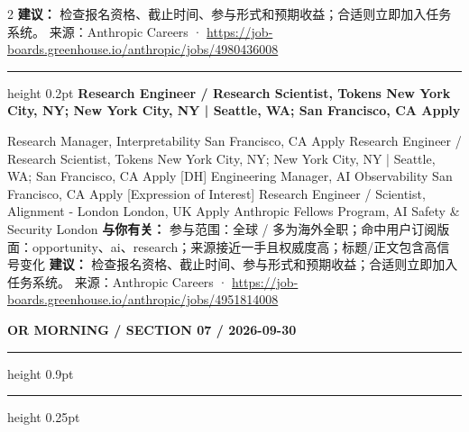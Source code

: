 \documentclass[10.5pt]{ctexart}
\begin{document}
\begin{multicols}{2}
\textbf{建议：} 检查报名资格、截止时间、参与形式和预期收益；合适则立即加入任务系统。
{\footnotesize\color{ormuted} 来源：Anthropic Careers · \url{https://job-boards.greenhouse.io/anthropic/jobs/4980436008}}
\vspace{2mm}
\hrule height 0.2pt
\vspace{2mm}
{\large\bfseries Research Engineer / Research Scientist, Tokens New York City, NY; New York City, NY | Seattle, WA; San Francisco, CA Apply}\par
[Expression of Interest] Research Manager, Interpretability San Francisco, CA Apply Research Engineer / Research Scientist, Tokens New York City, NY; New York City, NY | Seattle, WA; San Francisco, CA Apply [DH] Engineering Manager, AI Observability San Francisco, CA Apply [Expression of Interest] Research Engineer / Scientist, Alignment - London London, UK Apply Anthropic Fellows Program, AI Safety \& Security London
\textbf{与你有关：} 参与范围：全球 / 多为海外全职；命中用户订阅版面：opportunity、ai、research；来源接近一手且权威度高；标题/正文包含高信号变化
\textbf{建议：} 检查报名资格、截止时间、参与形式和预期收益；合适则立即加入任务系统。
{\footnotesize\color{ormuted} 来源：Anthropic Careers · \url{https://job-boards.greenhouse.io/anthropic/jobs/4951814008}}
\end{multicols}
\newpage
{\small\bfseries OR MORNING / SECTION 07 / 2026-09-30}
\vspace{2mm}
\hrule height 0.9pt
\vspace{1.5mm}
\hrule height 0.25pt
\vspace{4mm}
\end{document}
